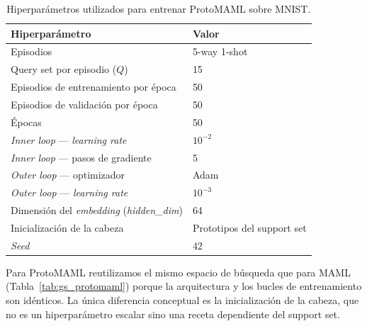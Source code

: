 \documentclass[12pt]{article}
\begin{document}
\begin{table}[h]
    \centering
    \begin{tabular}{ll}
        \hline
        Hiperparámetro                       & Valor          \\
        \hline
        Episodios                            & 5-way 1-shot   \\
        Query set por episodio ($Q$)         & 15             \\
        Episodios de entrenamiento por época & 50             \\
        Episodios de validación por época    & 50             \\
        Épocas                               & 50             \\
        \textit{Inner loop} — \textit{learning rate}    & $10^{-2}$ \\
        \textit{Inner loop} — pasos de gradiente        & 5         \\
        \textit{Outer loop} — optimizador               & Adam      \\
        \textit{Outer loop} — \textit{learning rate}    & $10^{-3}$ \\
        Dimensión del \textit{embedding} (\textit{hidden\_dim}) & 64 \\
        Inicialización de la cabeza            & Prototipos del support set \\
        \textit{Seed}                        & 42             \\
        \hline
    \end{tabular}
    \caption{Hiperparámetros utilizados para entrenar ProtoMAML sobre MNIST.}
    \label{tab:hp_protomaml}
\end{table}

Para ProtoMAML reutilizamos el mismo espacio de búsqueda que para MAML (Tabla~\ref{tab:gs_protomaml}) porque la arquitectura y los bucles de entrenamiento son idénticos. La única diferencia conceptual es la inicialización de la cabeza, que no es un hiperparámetro escalar sino una receta dependiente del support set.
\end{document}
